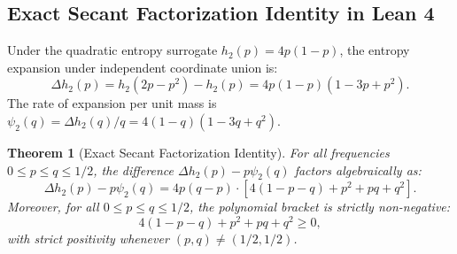 \documentclass[11pt,a4paper]{article}
\theoremstyle{plain}
\newtheorem{theorem}{Theorem}[section]
\theoremstyle{definition}
\theoremstyle{remark}
\begin{document}
\subsection{Exact Secant Factorization Identity in Lean 4}

Under the quadratic entropy surrogate $h_2(p) = 4p(1-p)$, the entropy expansion under independent coordinate union is:
\begin{equation}
\Delta h_2(p) = h_2(2p - p^2) - h_2(p) = 4p(1-p)(1 - 3p + p^2).
\end{equation}
The rate of expansion per unit mass is $\psi_2(q) = \Delta h_2(q) / q = 4(1-q)(1 - 3q + q^2)$.

\begin{theorem}[Exact Secant Factorization Identity]\label{thm:secant_factorization}
For all frequencies $0 \le p \le q \le 1/2$, the difference $\Delta h_2(p) - p \psi_2(q)$ factors algebraically as:
\begin{equation}
\Delta h_2(p) - p \psi_2(q) = 4p(q - p) \cdot \left[ 4(1 - p - q) + p^2 + pq + q^2 \right].
\end{equation}
Moreover, for all $0 \le p \le q \le 1/2$, the polynomial bracket is strictly non-negative:
\begin{equation}
4(1 - p - q) + p^2 + pq + q^2 \ge 0,
\end{equation}
with strict positivity whenever $(p, q) \ne (1/2, 1/2)$.
\end{theorem}
\end{document}
